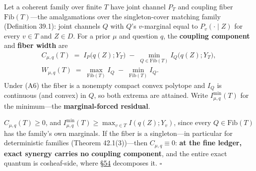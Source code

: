 \begin{thmdef}

Let a coherent family over finite \(T\) have joint channel \(P_T\) and coupling fiber \(\mathrm{Fib}(T)\)---\hspace{0pt}the amalgamations over the singleton-cover matching family (Definition 39.1): joint channels \(Q\) with \(Q\)'s \(v\)-marginal equal to \(P_v(\cdot \mid Z)\) for every \(v \in T\) and \(Z \in D\). For a prior \(\mu\) and question \(q\), the \textbf{coupling component} and \textbf{fiber width} are
\[\begin{gathered}C_{\mu,q}(T) \;=\; I_{P}\big(q(Z); Y_T\big) \;-\; \min_{Q \in \mathrm{Fib}(T)} I_{Q}\big(q(Z); Y_T\big), \\ W_{\mu,q}(T) \;=\; \max_{\mathrm{Fib}(T)} I_Q \;-\; \min_{\mathrm{Fib}(T)} I_Q .\end{gathered}\]
Under (A6) the fiber is a nonempty compact convex polytope and \(I_Q\) is continuous (and convex) in \(Q\), so both extrema are attained. Write \(I^{\min}_{\mu,q}(T)\) for the minimum---\hspace{0pt}the \textbf{marginal-forced residual}.
\end{thmdef}

\begin{thmplain}

\(C_{\mu,q}(T) \ge 0\), and \(I^{\min}_{\mu,q}(T) \ge \max_{v \in T} I(q(Z); Y_v)\), since every \(Q \in \mathrm{Fib}(T)\) has the family's own marginals. If the fiber is a singleton---\hspace{0pt}in particular for deterministic families (Theorem 42.1(3))---\hspace{0pt}then \(C_{\mu,q} \equiv 0\): \textbf{at the fine ledger, exact synergy carries no coupling component}, and the entire exact quantum is cosheaf-side, where \hyperlink{sec:54}{§54} decomposes it. \(\square\)
\end{thmplain}

